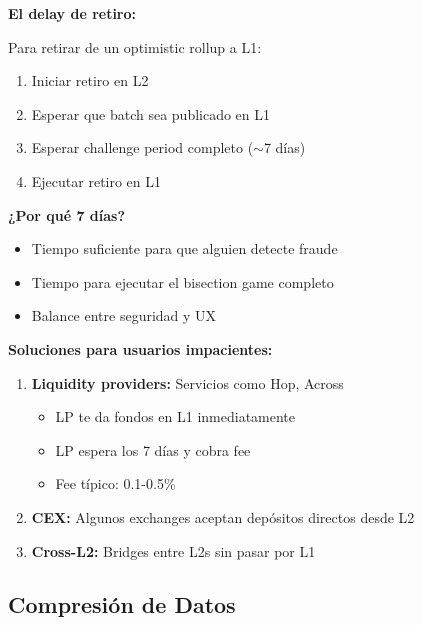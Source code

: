 \documentclass[11pt,a4paper,twoside,openright]{book}
\theoremstyle{definition}
\theoremstyle{plain}
\theoremstyle{remark}
\begin{document}
\begin{advertencia}
\textbf{El delay de retiro:}

Para retirar de un optimistic rollup a L1:
\begin{enumerate}
    \item Iniciar retiro en L2
    \item Esperar que batch sea publicado en L1
    \item Esperar challenge period completo ($\sim$7 días)
    \item Ejecutar retiro en L1
\end{enumerate}

\textbf{¿Por qué 7 días?}

\begin{itemize}
    \item Tiempo suficiente para que alguien detecte fraude
    \item Tiempo para ejecutar el bisection game completo
    \item Balance entre seguridad y UX
\end{itemize}

\textbf{Soluciones para usuarios impacientes:}

\begin{enumerate}
    \item \textbf{Liquidity providers:} Servicios como Hop, Across
    \begin{itemize}
        \item LP te da fondos en L1 inmediatamente
        \item LP espera los 7 días y cobra fee
        \item Fee típico: 0.1-0.5\%
    \end{itemize}
    
    \item \textbf{CEX:} Algunos exchanges aceptan depósitos directos desde L2
    
    \item \textbf{Cross-L2:} Bridges entre L2s sin pasar por L1
\end{enumerate}
\end{advertencia}

\subsection{Compresión de Datos}
\end{document}
